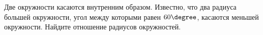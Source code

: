 \begin{ex}
	\begin{condition}
		Две окружности касаются внутренним образом. Известно, что два радиуса большей окружности, угол между которыми равен \( 60\degree \), касаются меньшей окружности. Найдите отношение радиусов окружностей.
	\end{condition}
\end{ex}